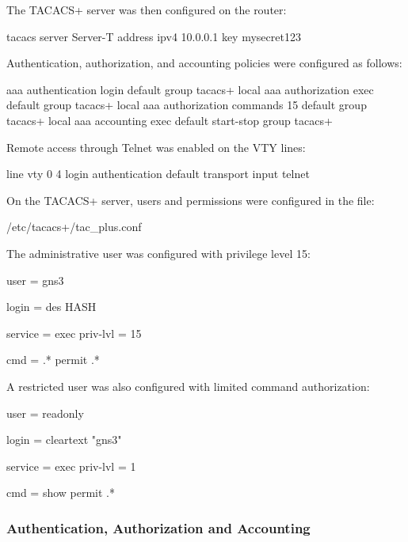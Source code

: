 \documentclass[12pt]{article}
\begin{document}
The TACACS+ server was then configured on the router:

\begin{configbox}
tacacs server Server-T
 address ipv4 10.0.0.1
 key mysecret123
\end{configbox}

Authentication, authorization, and accounting policies
were configured as follows:

\begin{configbox}
aaa authentication login default group tacacs+ local
aaa authorization exec default group tacacs+ local
aaa authorization commands 15 default group tacacs+ local
aaa accounting exec default start-stop group tacacs+
\end{configbox}

Remote access through Telnet was enabled on the VTY lines:

\begin{configbox}
line vty 0 4
 login authentication default
 transport input telnet
\end{configbox}

On the TACACS+ server, users and permissions were configured
in the file:

\begin{configbox}
/etc/tacacs+/tac_plus.conf
\end{configbox}

The administrative user was configured with privilege level 15:

\begin{configbox}
user = gns3 {
    login = des HASH

    service = exec {
        priv-lvl = 15
    }

    cmd = .* {
        permit .*
    }
}
\end{configbox}

A restricted user was also configured with limited command authorization:

\begin{configbox}
user = readonly {
    login = cleartext "gns3"

    service = exec {
        priv-lvl = 1
    }

    cmd = show {
        permit .*
    }
}
\end{configbox}

\subsubsection{Authentication, Authorization and Accounting}
\end{document}
